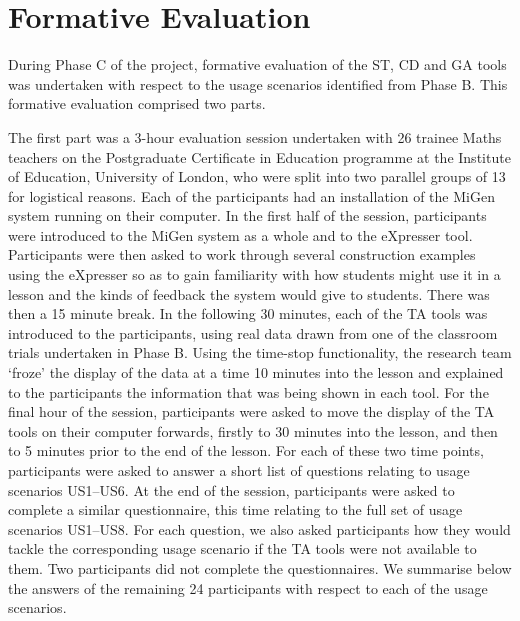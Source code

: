 
\section{Formative Evaluation}
\label{sec:formative-evaluation}

During Phase C of the project, formative evaluation of the ST, CD and GA tools was undertaken
with respect to the usage scenarios identified from Phase B. 
This formative evaluation comprised two parts.

The first part was a 3-hour evaluation session undertaken with 26
trainee Maths teachers on the Postgraduate Certificate in Education
programme at the Institute of Education, University of London, who were split into two
parallel groups of 13 for logistical reasons. Each of the participants
had an installation of the MiGen system running on their computer. In
the first half of the session, participants were introduced to the
MiGen system as a whole and to the eXpresser tool. 
Participants were then asked to work through several
construction examples using the eXpresser so as to gain familiarity
with how students might use it in a lesson and the kinds of feedback
the system would give to students. There was then a 15 minute
break. In the following 30 minutes, each of the TA tools was
introduced to the participants, using real data drawn from one of the
classroom trials undertaken in Phase B. 
Using the time-stop functionality, the research team `froze' the
display of the data at a time 10 minutes into the lesson and explained
to the participants the information that was being shown in each tool. 
For the final hour of the session, participants were asked to move the display 
of the TA tools on their computer forwards, firstly to 30 minutes into the lesson, and
then to 5 minutes prior to the end of the lesson. For each of these two
time points, participants were asked to answer a short list of 
questions relating to usage scenarios US1--US6.
At the end of the session, participants were asked to complete a similar 
questionnaire, this time relating to the full set of usage scenarios US1--US8. 
For each question, we also asked participants how they would tackle the corresponding
usage scenario if the TA tools were not available to them. 
Two participants did not complete the questionnaires.  
We summarise below the answers of the remaining 24 participants 
with respect to each of the usage scenarios.

